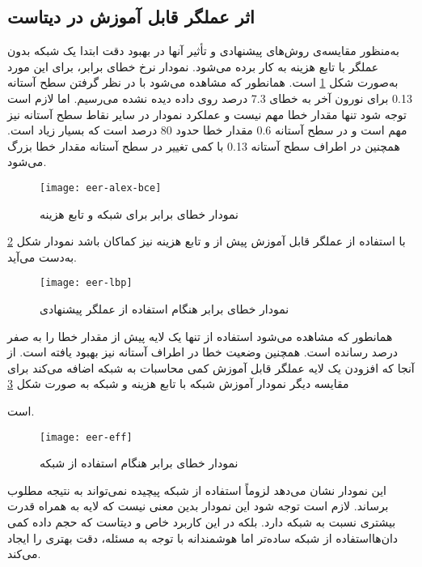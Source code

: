 \subsection{اثر عملگر  قابل آموزش در دیتاست }
به‌منظور مقایسه‌ی روش‌های پیشنهادی و تأثیر آنها در بهبود دقت ابتدا یک شبکه  بدون عملگر  با تابع هزینه  به کار برده می‌شود. نمودار نرخ خطای برابر، برای این مورد به‌صورت شکل 
\ref{fig:eer-alex-bce} 
است. همانطور که مشاهده می‌شود با در نظر گرفتن سطح آستانه 0.13 برای نورون آخر به خطای 7.3 درصد روی داده دیده نشده می‌رسیم. اما لازم است توجه شود تنها مقدار خطا مهم نیست و عملکرد نمودار در سایر نقاط سطح آستانه نیز مهم است و در سطح آستانه 0.6 مقدار خطا  حدود 80 درصد است که بسیار زیاد است. همچنین در اطراف سطح آستانه 0.13 با کمی تغییر در سطح آستانه مقدار خطا بزرگ می‌شود.
\begin{figure}[h]
	\centerline{\texttt{[image: eer-alex-bce]}}
	\caption{نمودار خطای برابر برای شبکه  و تابع هزینه }
	\label{fig:eer-alex-bce}
\end{figure}

با استفاده از عملگر  قابل آموزش پیش از  و تابع هزینه نیز کماکان  باشد نمودار شکل
\ref{fig:eer-lbp}
به‌دست می‌آید.
\begin{figure}[h]
	\centerline{\texttt{[image: eer-lbp]}}
	\caption{نمودار خطای برابر هنگام استفاده از عملگر  پیشنهادی}
	\label{fig:eer-lbp}
\end{figure}
همانطور که مشاهده می‌شود استفاده از تنها یک لایه 
 پیش از  مقدار خطا را به صفر درصد رسانده است. همچنین وضعیت خطا در اطراف آستانه نیز بهبود یافته است.
از آنجا که افزودن یک لایه عملگر  قابل آموزش کمی محاسبات به شبکه اضافه می‌کند برای مقایسه دیگر نمودار آموزش شبکه با تابع هزینه  و شبکه
به صورت شکل 
\ref{fig:eer-eff}

است.
\begin{figure}[h]
	\centerline{\texttt{[image: eer-eff]}}
	\caption{نمودار خطای برابر هنگام استفاده از شبکه }
	\label{fig:eer-eff}
\end{figure}

این نمودار نشان می‌دهد لزوماً استفاده از شبکه پیچیده نمی‌تواند به نتیجه مطلوب برساند. 
لازم است توجه شود این نمودار بدین معنی نیست که لایه  به همراه  قدرت بیشتری نسبت به شبکه  دارد. بلکه در این کاربرد خاص و دیتاست  که حجم داده کمی دان‌هااستفاده از شبکه ساده‌تر اما هوشمندانه با توجه به مسئله، دقت بهتری را ایجاد می‌کند.
